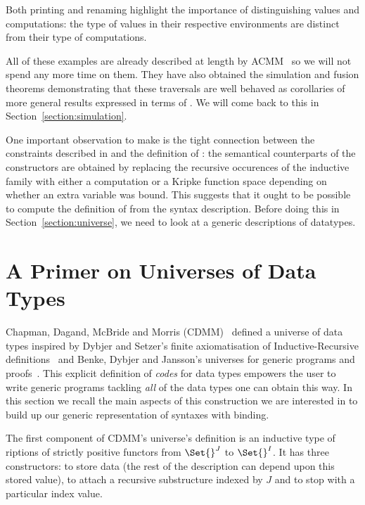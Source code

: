 
Both printing and renaming highlight the importance of distinguishing
values and computations: the type of values in their respective
environments are distinct from their type of computations.

All of these examples are already described at length by ACMM~\citeyear{allais2017type}
so we will not spend any
more time on them. They have also obtained the simulation and fusion
theorems demonstrating that these traversals are well behaved as
corollaries of more general results expressed in terms of \semfun{}.
We will come back to this in Section~\ref{section:simulation}.

One important observation to make is the tight connection between the constraints
described in \semrec{} and the definition of : the semantical counterparts
of the  constructors are obtained by replacing the recursive occurences of
the inductive family with either a computation or a Kripke function space depending
on whether an extra variable was bound. This suggests that it ought to be possible
to compute the definition of \semrec{} from the syntax description. Before doing this
in Section~\ref{section:universe}, we need to look at a generic descriptions of
datatypes.




\section{A Primer on Universes of Data Types}\label{section:data}

Chapman, Dagand, McBride and Morris (CDMM)~\citeyear{Chapman:2010:GAL:1863543.1863547}
defined a universe of data types inspired by Dybjer and Setzer's
finite axiomatisation of Inductive-Recursive definitions~\citeyear{Dybjer1999}
and Benke, Dybjer and Jansson's universes for generic programs and proofs~\citeyear{benke-ugpp}.
This explicit definition of \emph{codes} for data types empowers the
user to write generic programs tackling \emph{all} of the data types
one can obtain this way. In this section we recall the main aspects
of this construction we are interested in to build up our generic
representation of syntaxes with binding.

The first component of CDMM's universe's definition is an inductive type
of riptions of strictly positive functors from $\Set{}^J$ to
$\Set{}^I$. It has three constructors:  to store data (the rest of
the description can depend upon this stored value),  to attach a
recursive substructure indexed by $J$ and  to stop with a particular
index value.

